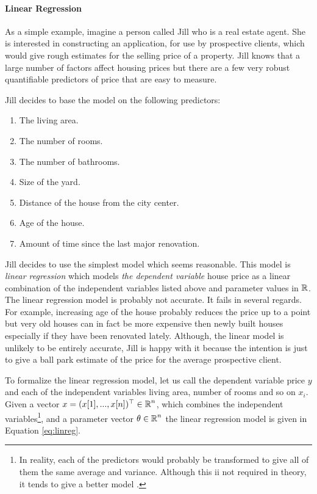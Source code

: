 \paragraph{Linear Regression} As a simple example, imagine a person
called Jill who is a real estate agent. She is interested in
constructing an application, for use by prospective clients, which
would give rough estimates for the selling price of a property. Jill
knows that a large number of factors affect housing prices but there
are a few very robust quantifiable predictors of price that are easy
to measure.

Jill decides to base the model on the following predictors:
\begin{enumerate}
\item The living area.
\item The number of rooms.
\item The number of bathrooms.
\item Size of the yard.
\item Distance of the house from the city center.
\item Age of the house.
\item Amount of time since the last major renovation.
\end{enumerate}

Jill decides to use the simplest model which seems reasonable. This
model is {\it linear regression} which models {\it the dependent
  variable} house price as a linear combination of the independent
variables listed above and parameter values in $\mbox{$\mathbb R$}$. The linear
regression model is probably not accurate. It fails in several
regards. For example, increasing age of the house probably reduces the
price up to a point but very old houses can in fact be more expensive
then newly built houses especially if they have been renovated lately.
Although, the linear model is unlikely to be entirely accurate, Jill is
happy with it because the intention is just to give a ball park
estimate of the price for the average prospective client.

To formalize the linear regression model, let us call the dependent
variable price $y$ and each of the independent variables living area,
number of rooms and so on $x_i$. Given a vector $x = (x[1], ...,
x[n])^\top \in \mbox{$\mathbb R$}^n$, which combines the independent
variables\footnote{In reality, each of the predictors would probably
  be transformed to give all of them the same average and
  variance. Although this ii not required in theory, it tends to give
  a better model \cite{someone}.}, and a parameter vector $\theta \in
\mbox{$\mathbb R$}^n$ the linear regression model is given in Equation
\ref{eq:linreg}.

